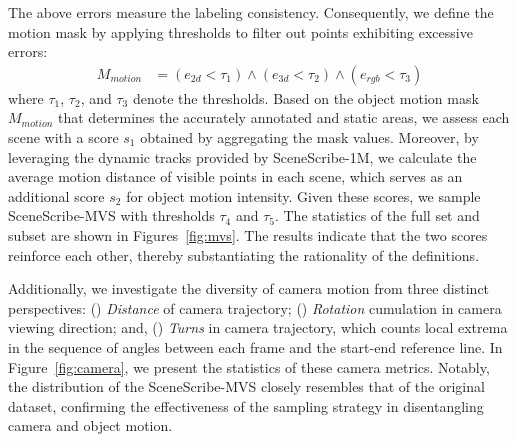 The above errors measure the labeling consistency. Consequently, we define the motion mask by applying thresholds to filter out points exhibiting excessive errors:
\begin{align}
M_{motion} &= ({e_{2d} < \tau_{1}}) \land (e_{3d} < \tau_{2}) \land  ({e_{rgb} < \tau_{3}})
\end{align}
where $\tau_1$, $\tau_2$, and $\tau_3$ denote the thresholds. 
Based on the object motion mask $M_{motion}$ that determines the accurately annotated and static areas, we assess each scene with a score $s_1$ obtained by aggregating the mask values. Moreover, by leveraging the dynamic tracks provided by SceneScribe-1M, we calculate the average motion distance of visible points in each scene, which serves as an additional score $s_2$ for object motion intensity. Given these scores, we sample SceneScribe-MVS with thresholds $\tau_4$ and $\tau_5$. The statistics of the full set and subset are shown in Figures~\ref{fig:mvs}. The results indicate that the two scores reinforce each other, thereby substantiating the rationality of the definitions.

Additionally, we investigate the diversity of camera motion from three distinct perspectives: 
(\textbf{}) \textit{Distance} of camera trajectory;
(\textbf{}) \textit{Rotation} cumulation in camera viewing direction;
and, (\textbf{}) \textit{Turns} in camera trajectory, which counts local extrema in the sequence of angles between each frame and the start-end reference line. In Figure~\ref{fig:camera}, we present the statistics of these camera metrics. Notably, the distribution of the SceneScribe-MVS closely resembles that of the original dataset, confirming the effectiveness of the sampling strategy in disentangling camera and object motion.



























